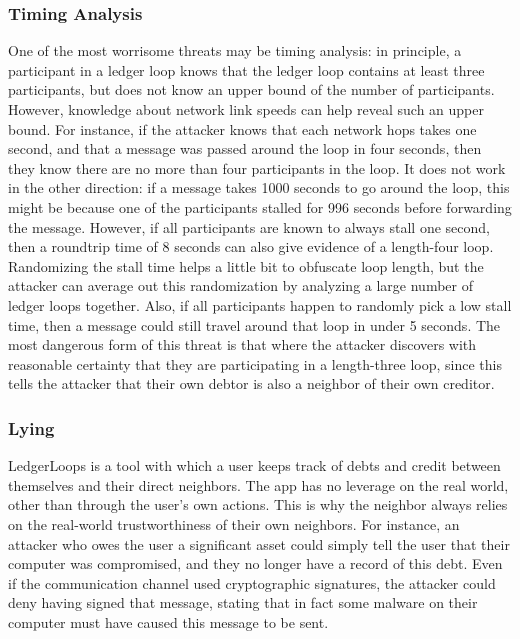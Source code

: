\documentclass[11pt,twoside,a4paper]{article}
\begin{document}
\subsubsection{Timing Analysis}
One of the most worrisome threats may be timing analysis: in principle, a participant in a ledger loop knows that the ledger loop contains at least three participants, but does not know an upper bound of the number of participants. However, knowledge about network link speeds can help reveal such an upper bound. For instance, if the attacker knows that each network hops takes one second, and that a message was passed around the loop in four seconds, then they know there are no more than four participants in the loop. It does not work in the other direction: if a message takes 1000 seconds to go around the loop, this might be because one of the participants stalled for 996 seconds before forwarding the message. However, if all participants are known to always stall one second, then a roundtrip time of 8 seconds can also give evidence of a length-four loop. Randomizing the stall time helps a little bit to obfuscate loop length, but the attacker can average out this randomization by analyzing a large number of ledger loops together. Also, if all participants happen to randomly pick a low stall time, then a message could still travel around that loop in under 5 seconds. The most dangerous form of this threat is that where the attacker discovers with reasonable certainty that they are participating in a length-three loop, since this tells the attacker that their own debtor is also a neighbor of their own creditor.

\subsubsection{Lying}
LedgerLoops is a tool with which a user keeps track of debts and credit between themselves and their direct neighbors. The app has no leverage on the real world, other than through the user's own actions. This is why the neighbor always relies on the real-world trustworthiness of their own neighbors. For instance, an attacker who owes the user a significant asset could simply tell the user that their computer was compromised, and they no longer have a record of this debt. Even if the communication channel used cryptographic signatures, the attacker could deny having signed that message, stating that in fact some malware on their computer must have caused this message to be sent.
\end{document}
